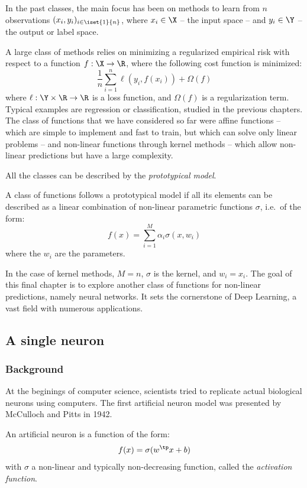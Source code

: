 \documentclass[toc, titlepaged]{../cs-classes/cs-classes}
\begin{document}
In the past classes, the main focus has been on methods to learn from $n$ observations $(x_i, y_i)_{i\in\iset{1}{n}}$, where $x_i\in\X$ -- the input space -- and $y_i\in\Y$ -- the output or label space.

A large class of methods relies on minimizing a regularized empirical risk with respect to a function $f:\X\to\R$, where the following cost function is minimized:
\begin{equation*}
    \frac{1}{n}\sum_{i=1}^n \ell(y_i, f(x_i))+\Omega(f)
\end{equation*}
where $\ell:\Y\times\R\to\R$ is a loss function, and $\Omega(f)$ is a regularization term. Typical examples are regression or classification, studied in the previous chapters. The class of functions that we have considered so far were affine functions -- which are simple to implement and fast to train, but which can solve only linear problems -- and non-linear functions through kernel methods -- which allow non-linear predictions but have a large complexity.

All the classes can be described by the \emph{prototypical model}.
\begin{definition}
    A class of functions follows a prototypical model if all its elements can be described as a linear combination of non-linear parametric functions $\sigma$, i.e.~of the form:
    \begin{equation*}
        f(x)=\sum_{i=1}^M\alpha_i\sigma(x, w_i)
    \end{equation*}
    where the $w_i$ are the parameters.
\end{definition}
In the case of kernel methods, $M=n$, $\sigma$ is the kernel, and $w_i=x_i$. The goal of this final chapter is to explore another class of functions for non-linear predictions, namely neural networks. It sets the cornerstone of Deep Learning, a vast field with numerous applications.

\subsection{A single neuron}
\subsubsection{Background}
At the beginings of computer science, scientists tried to replicate actual biological neurons using computers. The first artificial neuron model was presented by McCulloch and Pitts in 1942. 
\begin{definition}
    An artificial neuron is a function of the form:
    \begin{equation*}
        f(x)=\sigma(w^\tp x+b)
    \end{equation*}    
    with $\sigma$ a non-linear and typically non-decreasing function, called the \emph{activation function}.
\end{definition}
\end{document}
